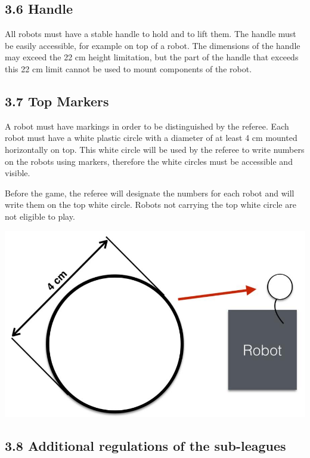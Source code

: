 \documentclass{article}
\begin{document}
\subsection{3.6 Handle \label{ref-024}}

All robots must have a stable handle to hold and to lift them. The handle must be easily accessible, for example on top of a robot. The dimensions of the handle may exceed the 22 cm height limitation, but the part of the handle that exceeds this 22 cm limit cannot be used to mount components of the robot.

\subsection{3.7 Top Markers\label{ref-025}}

\textcolor{color-5}{A robot must have markings in order to be distinguished by the referee. Each robot must have a white plastic circle with a diameter of at least 4 cm mounted horizontally on top. This white circle will be used by the referee to write numbers on the robots using markers, therefore the white circles must be accessible and visible.} 

\textcolor{color-5}{Before the game, the referee will designate the numbers for each robot and will write them on the top white circle. Robots not carrying the top white circle are not eligible to play.} 

\includegraphics[width=1\textwidth]{media/image4.jpeg}

\textbf{}

\subsection{3.8 Additional regulations of the sub-leagues \label{ref-026}}
\end{document}
